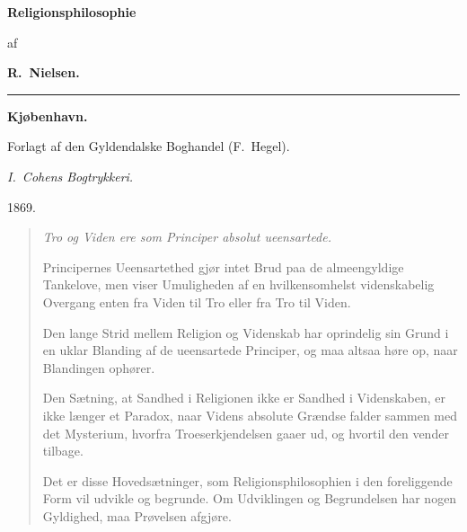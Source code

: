 \documentclass[12pt]{book}
\begin{document}
\begin{titlepage}
\centering
\vspace*{3.0cm}
{\Huge\bfseries Religionsphilosophie\par}
\vspace{1.4cm}
{\large af\par}
\vspace{1.0cm}
{\LARGE\bfseries R.\ Nielsen.\par}
\vspace{3.0cm}
\rule{4cm}{0.4pt}\par
\vspace{2.0cm}
{\large\bfseries Kjøbenhavn.\par}
\vspace{0.4cm}
{\normalsize Forlagt af den Gyldendalske Boghandel (F.\ Hegel).\par}
\vspace{0.3cm}
{\small\emph{I.\ Cohens Bogtrykkeri.}\par}
\vspace{0.6cm}
{\large 1869.\par}
\end{titlepage}

\frontmatter

\thispagestyle{empty}
\vspace*{0.10\textheight}
\begin{quote}
\itshape\noindent
Tro og Viden ere som Principer absolut ueensartede.

\medskip

Principernes Ueensartethed gjør intet Brud paa de almeengyldige
Tankelove, men viser Umuligheden af en hvilkensomhelst
videnskabelig Overgang enten fra Viden til Tro eller fra Tro til Viden.

\medskip

Den lange Strid mellem Religion og Videnskab har oprindelig sin
Grund i en uklar Blanding af de ueensartede Principer, og maa
altsaa høre op, naar Blandingen ophører.

\medskip

Den Sætning, at Sandhed i Religionen ikke er Sandhed i Videnskaben,
er ikke længer et Paradox, naar Videns absolute Grændse falder
sammen med det Mysterium, hvorfra Troeserkjendelsen gaaer ud, og
hvortil den vender tilbage.

\medskip

Det er disse Hovedsætninger, som Religionsphilosophien i den
foreliggende Form vil udvikle og begrunde. Om Udviklingen og
Begrundelsen har nogen Gyldighed, maa Prøvelsen afgjøre.
\end{quote}
\end{document}
